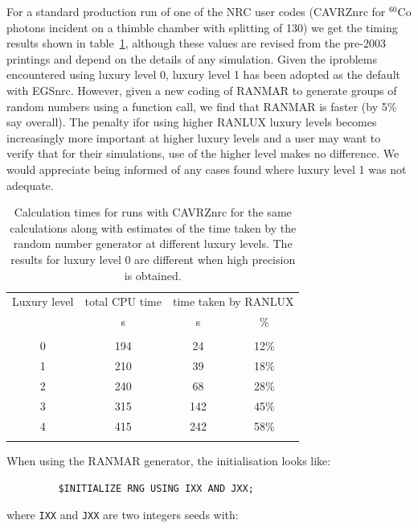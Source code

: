 For a standard production run of one of the NRC user codes (CAVRZnrc for
$^{60}$Co photons incident on a thimble chamber with splitting of 130) we
get the timing results shown in table~\ref{tab_ll_times}, although these
values are revised from the pre-2003 printings and depend on the details of
any simulation.  Given the iproblems encountered using luxury level 0,
luxury level 1 has been
adopted as the default with EGSnrc. However, given a new coding of RANMAR
to generate groups of random numbers using a function call, we find that
RANMAR is faster (by 5\% say overall).  The penalty ifor using higher
RANLUX luxury levels becomes increasingly more
important at higher luxury levels and a user may want to verify that for
their simulations, use of the higher level makes no difference. We would
appreciate being informed of any cases found where luxury level 1 was not
adequate.
\begin{table}[htb]
\begin{center}
\caption{Calculation times for runs with CAVRZnrc for the same calculations
along with estimates of the time taken by the random number generator at
different luxury levels.  The results for luxury level 0 are different when
high precision is obtained.\vspace{3mm}
\label{tab_ll_times}
}
\begin{tabular}{ |c c c c |}
\hline
Luxury level & total CPU time  & \multicolumn{2}{c|}{time taken by RANLUX} \\
             &  s &  s  & \%\\
\hline
&&&\\
0	&194	& 24 & 12\% \\
1	&210	& 39 & 18\% \\
2	&240	& 68 & 28\% \\
3	&315	& 142  &45\% \\
4	&415	& 242  &58\% \\
&&&\\
\hline
    \end{tabular}
    \end{center}
    \end{table}


When using the RANMAR generator, the initialisation looks like:
\begin{verbatim}
         $INITIALIZE RNG USING IXX AND JXX;
\end{verbatim}
where {\tt IXX} and {\tt JXX} are two integers seeds with:

